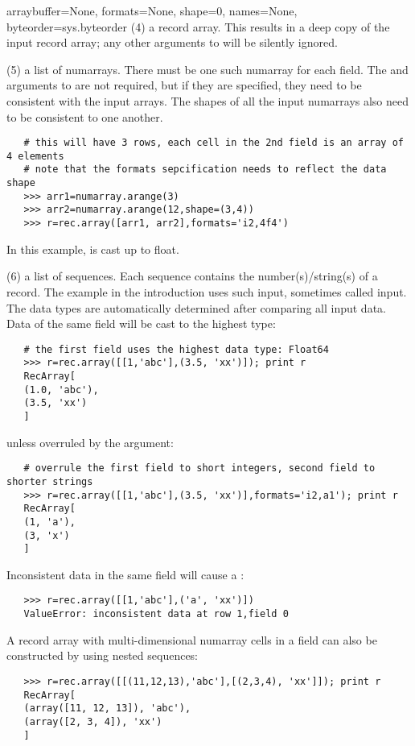 \begin{funcdesc}{array}{buffer=None, formats=None, shape=0, 
names=None, byteorder=sys.byteorder}
   (4) a record array.  This results in a deep copy of the input record array; 
   any other arguments to  will be silently ignored.
   
   (5) a list of numarrays.  There must be one such numarray for each field.  
   The  and  arguments to  are not 
   required, but if they are specified, they need to be consistent with the 
   input arrays.  The shapes of all the input numarrays also need to be 
   consistent to one another.
   \begin{verbatim}
   # this will have 3 rows, each cell in the 2nd field is an array of 4 elements
   # note that the formats sepcification needs to reflect the data shape
   >>> arr1=numarray.arange(3)
   >>> arr2=numarray.arange(12,shape=(3,4))
   >>> r=rec.array([arr1, arr2],formats='i2,4f4')
   \end{verbatim}
   
   In this example,  is cast up to float.
   
   (6) a list of sequences.  Each sequence contains the 
   number(s)/string(s) of a record.  The example in the introduction 
   uses such input, sometimes called  input.  The data 
   types are automatically determined after comparing all input data.  
   Data of the same field will be cast to the highest type:
   \begin{verbatim}
   # the first field uses the highest data type: Float64
   >>> r=rec.array([[1,'abc'],(3.5, 'xx')]); print r
   RecArray[ 
   (1.0, 'abc'),
   (3.5, 'xx')
   ]
   \end{verbatim}
   unless overruled by the  argument:
   \begin{verbatim}
   # overrule the first field to short integers, second field to shorter strings
   >>> r=rec.array([[1,'abc'],(3.5, 'xx')],formats='i2,a1'); print r
   RecArray[ 
   (1, 'a'),
   (3, 'x')
   ]
   \end{verbatim}
   Inconsistent data in the same field will cause a :
   \begin{verbatim}
   >>> r=rec.array([[1,'abc'],('a', 'xx')])
   ValueError: inconsistent data at row 1,field 0
   \end{verbatim}
   
   A record array with multi-dimensional numarray cells in a field can also 
   be constructed by using nested sequences:
   \begin{verbatim}
   >>> r=rec.array([[(11,12,13),'abc'],[(2,3,4), 'xx']]); print r
   RecArray[ 
   (array([11, 12, 13]), 'abc'),
   (array([2, 3, 4]), 'xx')
   ]
   \end{verbatim}
\end{funcdesc}
   
